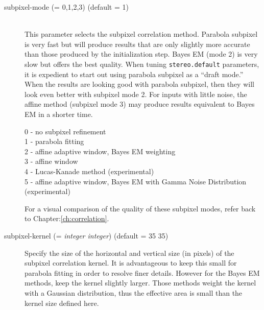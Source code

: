 \begin{description}

\item[subpixel-mode \textnormal{\small{(= 0,1,2,3)}} (default = 1)] \hfill \\
  This parameter selects the subpixel correlation method. Parabola subpixel 
  is very fast but will produce results that are only slightly more accurate
   than those produced by the initialization step. Bayes EM (mode 2) 
  is very slow but offers the best quality. When tuning {\tt stereo.default} 
  parameters, it is expedient to start out using parabola subpixel as a 
  ``draft mode.'' When the results are looking good with parabola subpixel, 
  then they  will look even better with subpixel mode 2.  For inputs with 
  little noise, the affine method (subpixel mode 3) may produce results
  equivalent to Bayes EM in a shorter time.

  \begin{description}
    \item[0 - no subpixel refinement]
    \item[1 - parabola fitting ]
    \item[2 - affine adaptive window, Bayes EM weighting ]
    \item[3 - affine window ]
    \item[4 - Lucas-Kanade method (experimental)]
    \item[5 - affine adaptive window, Bayes EM with Gamma Noise Distribution (experimental) ]
  \end{description}

  For a visual comparison of the quality of these subpixel modes,
  refer back to Chapter:\ref{ch:correlation}.

\item[subpixel-kernel \textnormal{\small{(= \emph{integer integer})}} (default = 35 35)]
  Specify the size of the horizontal and vertical size (in pixels) of
  the subpixel correlation kernel. It is advantageous to keep this
  small for parabola fitting in order to resolve finer
  details. However for the Bayes EM methods, keep the kernel slightly
  larger. Those methods weight the kernel with a Gaussian
  distribution, thus the effective area is small than the kernel size
  defined here.

\end{description}


